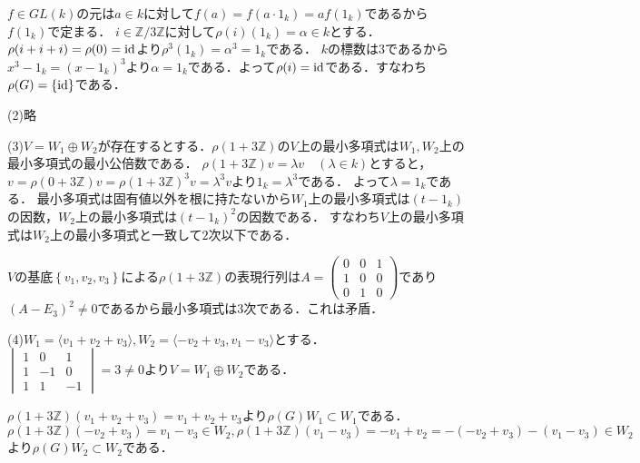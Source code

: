 \documentclass[
		book,
		head_space=20mm,
		foot_space=20mm,
		gutter=10mm,
		line_length=190mm
]{jlreq}
\begin{document}
$f \in GL(k)$の元は$a\in k$に対して$f(a)=f(a\cdot1_k)=af(1_k)$であるから$f(1_k)$で定まる．
$i \in \mathbb{Z}/3\mathbb{Z}$に対して$\rho(i)(1_k)=\alpha\in k$とする．$\rho(i+i+i)=\rho(0)=\mathop{\mathrm{id}}$より$\rho^3(1_k)=\alpha^3=1_k$である．
$k$の標数は$3$であるから$x^3-1_k=(x-1_k)^3$より$\alpha=1_k$である．よって$\rho(i)=\mathop{\mathrm{id}}$である．すなわち$\rho(G)=\left\{ \mathop{\mathrm{id}} \right\}$である．

(2)略

(3)$V=W_1\oplus W_2$が存在するとする．$\rho(1+3\mathbb{Z})$の$V$上の最小多項式は$W_1,W_2$上の最小多項式の最小公倍数である．
$\rho(1+3\mathbb{Z})v=\lambda v\quad(\lambda\in k)$とすると，$v=\rho(0+3\mathbb{Z})v=\rho(1+3\mathbb{Z})^3v=\lambda^3 v$より$1_k=\lambda^3$である．
よって$\lambda=1_k$である．
最小多項式は固有値以外を根に持たないから$W_1$上の最小多項式は$(t-1_k)$の因数，$W_2$上の最小多項式は$(t-1_k)^2$の因数である．
すなわち$V$上の最小多項式は$W_2$上の最小多項式と一致して$2$次以下である．

$V$の基底$\left\{ v_1,v_2,v_3 \right\}$による$\rho(1+3\mathbb{Z})$の表現行列は$A=\begin{pmatrix}
0 & 0 & 1 \\
1 & 0 & 0 \\
0 & 1 & 0
\end{pmatrix}$であり$(A-E_3)^2\neq 0$であるから最小多項式は$3$次である．これは矛盾．

(4)$W_1=\langle v_1+v_2+v_3 \rangle, W_2=\langle -v_2+v_3,v_1-v_3 \rangle$とする．
$\begin{vmatrix}
1 & 0 & 1 \\
1 & -1 & 0 \\
1 & 1 & -1
\end{vmatrix}=3\neq 0$より$V=W_1\oplus W_2$である．

$\rho(1+3\mathbb{Z})(v_1+v_2+v_3)=v_1+v_2+v_3$より$\rho(G)W_1\subset W_1$である．
$\rho(1+3\mathbb{Z})(-v_2+v_3)=v_1-v_3\in W_2, \rho(1+3\mathbb{Z})(v_1-v_3)=-v_1+v_2=-(-v_2+v_3)-(v_1-v_3)\in W_2$より$\rho(G)W_2\subset W_2$である．
\end{document}
